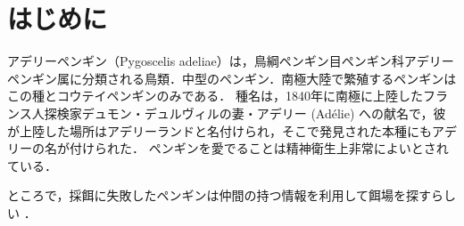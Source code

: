 \chapter{はじめに}
\thispagestyle{myheadings}

アデリーペンギン（Pygoscelis adeliae）は，鳥綱ペンギン目ペンギン科アデリーペンギン属に分類される鳥類．中型のペンギン．南極大陸で繁殖するペンギンはこの種とコウテイペンギンのみである．
種名は，1840年に南極に上陸したフランス人探検家デュモン・デュルヴィルの妻・アデリー (Adélie) への献名で，彼が上陸した場所はアデリーランドと名付けられ，そこで発見された本種にもアデリーの名が付けられた．
ペンギンを愛でることは精神衛生上非常によいとされている．

ところで，採餌に失敗したペンギンは仲間の持つ情報を利用して餌場を探すらしい \cite{採餌に失敗したペンギンは仲間の持つ情報を利用して餌場を探す}．

